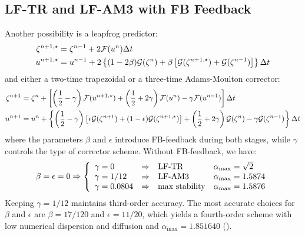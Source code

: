 \subsection{LF-TR and LF-AM3 with FB Feedback}
Another possibility is a leapfrog predictor:
\begin{equation}\begin{split}
   \zeta^{n+1,\star} &= \zeta^{n-1} + 2{\cal F}(u^n) \Delta t \\
   u^{n+1,\star} &= u^{n-1} + 2\left\{ (1-2\beta){\cal G}(\zeta^n)
   + \beta \left[{\cal G}(\zeta^{n+1,\star}) + {\cal G}(\zeta^{n-1}) \right]
   \right\} \Delta t
\end{split}\end{equation}
and either a two-time trapezoidal or a three-time Adams-Moulton corrector:
\begin{equation}\begin{split}
   \zeta^{n+1} &= \zeta^n + \left[ \left( \frac{1}{2}-\gamma \right)
   {\cal F}(u^{n+1,\star}) + \left( \frac{1}{2}+ 2\gamma \right) {\cal F}(u^n) -
   \gamma {\cal F}(u^{n-1}) \right] \Delta t \\
   u^{n+1} &= u^n + \left\{ \left( \frac{1}{2}-\gamma \right) \left[
   \epsilon {\cal G}(\zeta^{n+1}) +
   (1-\epsilon){\cal G}(\zeta^{n+1,\star}) \right] +
   \left( \frac{1}{2} + 2\gamma \right) {\cal G}(\zeta^n) - \gamma  {\cal
   G}(\zeta^{n-1}) \right\} \Delta t
\end{split}\end{equation}
where the parameters $\beta$ and $\epsilon$ introduce FB-feedback
during both stages, while $\gamma$ controls the type of corrector
scheme. Without FB-feedback, we have:
$$
   \beta = \epsilon = 0 \Rightarrow \left\{ \begin{array}
   { l @{\quad \Rightarrow \quad}l l}
   \gamma = 0 & \hbox{LF-TR} & \alpha_{\max} = \sqrt{2} \\
   \gamma = 1/12 & \hbox{LF-AM3} & \alpha_{\max} = 1.5874 \\
   \gamma = 0.0804 & \hbox{max stability} & \alpha_{\max}
   = 1.5876
   \end{array} \right.
$$
Keeping $\gamma = 1/12$ maintains third-order accuracy. The most
accurate choices for $\beta$ and $\epsilon$ are $\beta = 17/120$ and
$\epsilon = 11/20$, which yields a fourth-order scheme with low
numerical dispersion and diffusion and $\alpha_{\max} =
1.851640$ (\cite{SS2008b}).

